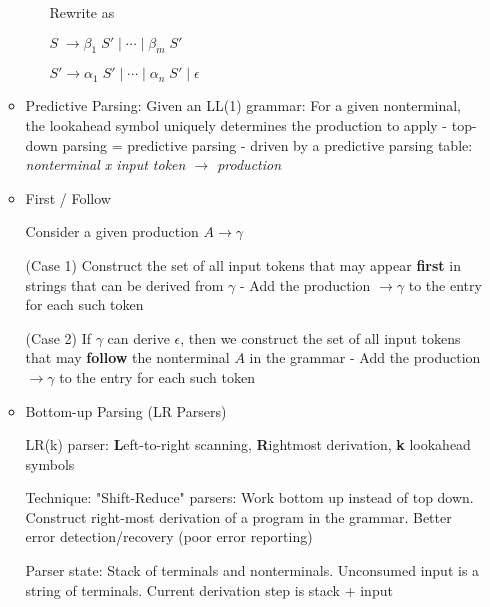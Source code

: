 \begin{itemize}
\begin{itemize}
\begin{itemize}
			Rewrite as
			
			$S\; \rightarrow \beta _1\; S' \;|\; \cdots \;|\; \beta _m\; S'$
			
			$S' \rightarrow \alpha_1\; S' \;|\;  \cdots \;|\; \alpha_n\; S' \;|\; \epsilon$ 
		\end{itemize}
		\item Predictive Parsing: Given an LL(1) grammar: For a given nonterminal, the lookahead symbol uniquely determines the production to apply - top-down parsing = predictive parsing - driven by a predictive parsing table: \textit{nonterminal x input token $\rightarrow$ production}
		\item First / Follow
		
		Consider a given production $A \rightarrow \gamma$
		
		(Case 1) Construct the set of all input tokens that may appear \textbf{first} in strings that can be derived from $\gamma$ - Add the production $\rightarrow \gamma$ to the entry for each such token
		
		(Case 2) If $\gamma$ can derive $\epsilon$, then we construct the set of all input tokens that may \textbf{follow} the nonterminal $A$ in the grammar - Add the production $\rightarrow \gamma$ to the entry for each such token
		\item Bottom-up Parsing (LR Parsers)
		
		LR(k) parser: \textbf{L}eft-to-right scanning, \textbf{R}ightmost derivation, \textbf{k} lookahead symbols
		
		Technique: "Shift-Reduce" parsers: Work bottom up instead of top down. Construct right-most derivation of a program in the grammar. Better error detection/recovery (poor error reporting)
		
		Parser state: Stack of terminals and nonterminals. Unconsumed input is a string of terminals. Current derivation step is stack + input
		

\end{itemize}
\end{itemize}
